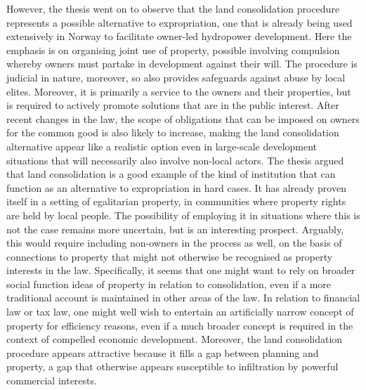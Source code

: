 {However, the thesis went on to observe that the land consolidation procedure represents a possible alternative to expropriation, one that is already being used extensively in Norway to facilitate owner-led hydropower development. Here the emphasis is on organising joint use of property, possible involving compulsion whereby owners must partake in development against their will. The procedure is judicial in nature, moreover, so also provides safeguards against abuse by local elites. Moreover, it is primarily a service to the owners and their properties, but is required to actively promote solutions that are in the public interest. After recent changes in the law, the scope of obligations that can be imposed on owners for the common good is also likely to increase, making the land consolidation alternative appear like a realistic option even in large-scale development situations that will necessarily also involve non-local actors. The thesis argued that land consolidation is a good example of the kind of institution that can function as an alternative to expropriation in hard cases. It has already proven itself in a setting of egalitarian property, in communities where property rights are held by local people. The possibility of employing it in situations where this is not the case remains more uncertain, but is an interesting prospect. Arguably, this would require including non-owners in the process as well, on the basis of connections to property that might not otherwise be recognised as property interests in the law. Specifically, it seems that one might want to rely on broader social function ideas of property in relation to consolidation, even if a more traditional account is maintained in other areas of the law. In relation to financial law or tax law, one might well wish to entertain an artificially narrow concept of property for efficiency reasons, even if a much broader concept is required in the context of compelled economic development. Moreover, the land consolidation procedure appears attractive because it fills a gap between planning and property, a gap that otherwise appears susceptible to infiltration by powerful commercial interests.


}

